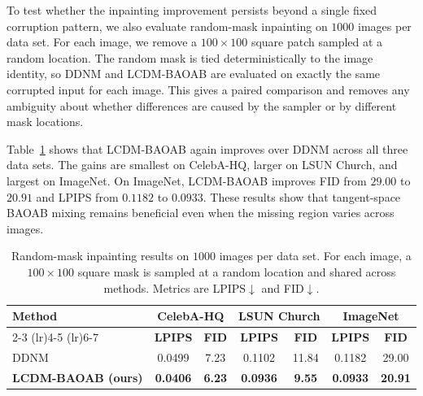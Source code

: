 \documentclass[twoside,11pt]{article}
\numberwithin{equation}{section}
\begin{document}
To test whether the inpainting improvement persists beyond a single fixed
corruption pattern, we also evaluate random-mask inpainting on \(1000\) images
per data set. For each image, we remove a \(100\times100\) square patch sampled
at a random location. The random mask is tied deterministically to the image
identity, so DDNM and LCDM-BAOAB are evaluated on exactly the same corrupted
input for each image. This gives a paired comparison and removes any ambiguity
about whether differences are caused by the sampler or by different mask
locations.

Table~\ref{tab:randommask_inpainting} shows that LCDM-BAOAB again improves over
DDNM across all three data sets. The gains are smallest on CelebA-HQ, larger on
LSUN Church, and largest on ImageNet. On ImageNet, LCDM-BAOAB improves FID from
\(29.00\) to \(20.91\) and LPIPS from \(0.1182\) to \(0.0933\). These results
show that tangent-space BAOAB mixing remains beneficial even when the missing
region varies across images.

\begin{table}[ht]
\centering
\begin{tabular}{lcccccc}
\toprule
\textbf{Method}
& \multicolumn{2}{c}{\textbf{CelebA-HQ}}
& \multicolumn{2}{c}{\textbf{LSUN Church}}
& \multicolumn{2}{c}{\textbf{ImageNet}} \\
\cmidrule(lr){2-3} \cmidrule(lr){4-5} \cmidrule(lr){6-7}
& \textbf{LPIPS} & \textbf{FID}
& \textbf{LPIPS} & \textbf{FID}
& \textbf{LPIPS} & \textbf{FID} \\
\midrule
DDNM
& 0.0499 & 7.23
& 0.1102 & 11.84
& 0.1182 & 29.00 \\
\textbf{LCDM-BAOAB (ours)}
& \textbf{0.0406} & \textbf{6.23}
& \textbf{0.0936} & \textbf{9.55}
& \textbf{0.0933} & \textbf{20.91} \\
\bottomrule
\end{tabular}
\caption{Random-mask inpainting results on \(1000\) images per data set. For each image, a \(100\times100\) square mask is sampled at a random location and shared across methods. Metrics are LPIPS\(\downarrow\) and FID\(\downarrow\).}
\label{tab:randommask_inpainting}
\end{table}
\end{document}
